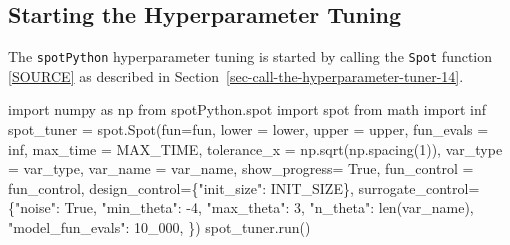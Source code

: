 \documentclass[
  letterpaper,
  DIV=11,
  numbers=noendperiod]{scrreprt}
\newenvironment{Shaded}{\begin{snugshade}}{\end{snugshade}}
\newcommand{\BuiltInTok}[1]{\textcolor[rgb]{0.00,0.23,0.31}{#1}}
\newcommand{\DecValTok}[1]{\textcolor[rgb]{0.68,0.00,0.00}{#1}}
\newcommand{\ImportTok}[1]{\textcolor[rgb]{0.00,0.46,0.62}{#1}}
\newcommand{\NormalTok}[1]{\textcolor[rgb]{0.00,0.23,0.31}{#1}}
\newcommand{\OperatorTok}[1]{\textcolor[rgb]{0.37,0.37,0.37}{#1}}
\newcommand{\StringTok}[1]{\textcolor[rgb]{0.13,0.47,0.30}{#1}}
\newcommand{\VariableTok}[1]{\textcolor[rgb]{0.07,0.07,0.07}{#1}}
\begin{document}
\hypertarget{sec-call-the-hyperparameter-tuner-31}{%
\subsection{Starting the Hyperparameter
Tuning}\label{sec-call-the-hyperparameter-tuner-31}}

The \texttt{spotPython} hyperparameter tuning is started by calling the
\texttt{Spot} function
\href{https://github.com/sequential-parameter-optimization/spotPython/blob/main/src/spotPython/spot/spot.py}{{[}SOURCE{]}}
as described in Section~\ref{sec-call-the-hyperparameter-tuner-14}.

\begin{Shaded}
\begin{Highlighting}[]
\ImportTok{import}\NormalTok{ numpy }\ImportTok{as}\NormalTok{ np}
\ImportTok{from}\NormalTok{ spotPython.spot }\ImportTok{import}\NormalTok{ spot}
\ImportTok{from}\NormalTok{ math }\ImportTok{import}\NormalTok{ inf}
\NormalTok{spot\_tuner }\OperatorTok{=}\NormalTok{ spot.Spot(fun}\OperatorTok{=}\NormalTok{fun,}
\NormalTok{                   lower }\OperatorTok{=}\NormalTok{ lower,}
\NormalTok{                   upper }\OperatorTok{=}\NormalTok{ upper,}
\NormalTok{                   fun\_evals }\OperatorTok{=}\NormalTok{ inf,}
\NormalTok{                   max\_time }\OperatorTok{=}\NormalTok{ MAX\_TIME,}
\NormalTok{                   tolerance\_x }\OperatorTok{=}\NormalTok{ np.sqrt(np.spacing(}\DecValTok{1}\NormalTok{)),}
\NormalTok{                   var\_type }\OperatorTok{=}\NormalTok{ var\_type,}
\NormalTok{                   var\_name }\OperatorTok{=}\NormalTok{ var\_name,}
\NormalTok{                   show\_progress}\OperatorTok{=} \VariableTok{True}\NormalTok{,}
\NormalTok{                   fun\_control }\OperatorTok{=}\NormalTok{ fun\_control,}
\NormalTok{                   design\_control}\OperatorTok{=}\NormalTok{\{}\StringTok{"init\_size"}\NormalTok{: INIT\_SIZE\},}
\NormalTok{                   surrogate\_control}\OperatorTok{=}\NormalTok{\{}\StringTok{"noise"}\NormalTok{: }\VariableTok{True}\NormalTok{,}
                                      \StringTok{"min\_theta"}\NormalTok{: }\OperatorTok{{-}}\DecValTok{4}\NormalTok{,}
                                      \StringTok{"max\_theta"}\NormalTok{: }\DecValTok{3}\NormalTok{,}
                                      \StringTok{"n\_theta"}\NormalTok{: }\BuiltInTok{len}\NormalTok{(var\_name),}
                                      \StringTok{"model\_fun\_evals"}\NormalTok{: }\DecValTok{10\_000}\NormalTok{,}
\NormalTok{                                      \})}
\NormalTok{spot\_tuner.run()}
\end{Highlighting}
\end{Shaded}
\end{document}
